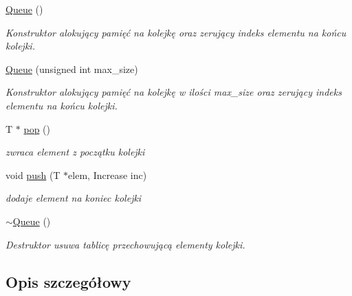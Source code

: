 \begin{DoxyCompactItemize}
\item 
\hypertarget{class_array_implementation_1_1_queue_ac7a57953bf0b2f661e51eebff2ce3a33}{\hyperlink{class_array_implementation_1_1_queue_ac7a57953bf0b2f661e51eebff2ce3a33}{Queue} ()}\label{class_array_implementation_1_1_queue_ac7a57953bf0b2f661e51eebff2ce3a33}

\begin{DoxyCompactList}\small\item\em Konstruktor alokujący pamięć na kolejkę oraz zerujący indeks elementu na końcu kolejki. \end{DoxyCompactList}\item 
\hyperlink{class_array_implementation_1_1_queue_ac17b065619517a4cbdd0f5b32d007548}{Queue} (unsigned int max\-\_\-size)
\begin{DoxyCompactList}\small\item\em Konstruktor alokujący pamięć na kolejkę w ilości max\-\_\-size oraz zerujący indeks elementu na końcu kolejki. \end{DoxyCompactList}\item 
T $\ast$ \hyperlink{class_array_implementation_1_1_queue_a9cb6a0e891a5bd1086028dadcadcc8c3}{pop} ()
\begin{DoxyCompactList}\small\item\em zwraca element z początku kolejki \end{DoxyCompactList}\item 
void \hyperlink{class_array_implementation_1_1_queue_afafcb7c4d247f8e887b6f29dc179bd38}{push} (T $\ast$elem, Increase inc)
\begin{DoxyCompactList}\small\item\em dodaje element na koniec kolejki \end{DoxyCompactList}\item 
\hypertarget{class_array_implementation_1_1_queue_ad178e4eee785f70f83fb9526fbaeea16}{\hyperlink{class_array_implementation_1_1_queue_ad178e4eee785f70f83fb9526fbaeea16}{$\sim$\-Queue} ()}\label{class_array_implementation_1_1_queue_ad178e4eee785f70f83fb9526fbaeea16}

\begin{DoxyCompactList}\small\item\em Destruktor usuwa tablicę przechowującą elementy kolejki. \end{DoxyCompactList}\end{DoxyCompactItemize}


\subsection{Opis szczegółowy}
